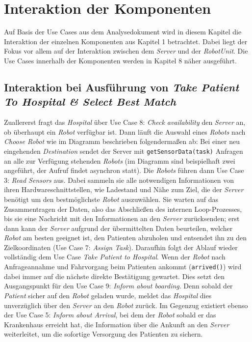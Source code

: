 \section{Interaktion der Komponenten}
Auf Basis der Use Cases aus dem Analysedokument wird in diesem Kapitel die Interaktion der einzelnen Komponenten aus Kapitel 1 betrachtet. Dabei liegt der Fokus vor allem auf der Interaktion zwischen dem \emph{Server} und der \emph{RobotUnit}. Die Use Cases innerhalb der Komponenten werden in Kapitel 8 näher ausgeführt. \\


\subsection*{Interaktion bei Ausführung von \emph{Take Patient To Hospital \& Select Best Match}}

Zuallererst fragt das \emph{Hospital} über Use Case 8: \emph{Check availability} den \emph{Server} an, ob überhaupt ein \emph{Robot} verfügbar ist. Dann läuft die Auswahl eines \emph{Robots} nach \emph{Choose Robot} wie im Diagramm beschrieben folgendermaßen ab: Bei einer neu eingehenden \emph{Destination} sendet der Server mit \texttt{getSensorData(task)} Anfragen an alle zur Verfügung stehenden \emph{Robots} (im Diagramm sind beispielhaft zwei angeführt, der Aufruf findet asynchron statt). Die \emph{Robots} führen dann Use Case 3: \emph{Read Sensors} aus. Dabei sammeln sie alle notwendigen Informationen von ihren Hardwareschnittstellen, wie Ladestand und Nähe zum Ziel, die der \emph{Server} benötigt um den bestmöglichste \emph{Robot} auszuwählen. Sie warten auf das Zusammentragen der Daten, also das Abschließen des internen Loop-Prozesses, bis sie eine Nachricht mit den Informationen an den \emph{Server} zurücksenden; erst dann kann der \emph{Server} aufgrund der übermittelten Daten beurteilen, welcher \emph{Robot} am besten geeignet ist, den Patienten abzuholen und entsendet ihn zu den Zielkoordinaten (Use Case 7: \emph{Assign Task}). Daraufhin folgt der Ablauf wieder vollständig dem Use Case \emph{Take Patient to Hospital}. Wenn der \emph{Robot} nach Anfrageannahme und Fahrvorgang beim Patienten ankommt (\texttt{arrived()}) wird dabei immer auf die nächste direkte Bestätigung gewartet. Dies setzt den Ausgangspunkt für den Use Case 9: \emph{Inform about boarding}. Denn sobald der \emph{Patient} sicher auf den \emph{Robot} geladen wurde, meldet das \emph{Hospital} dies unverzüglich über den \emph{Server} an den \emph{Robot} zurück. Im Gegenzug existiert ebenso der Use Case 5: \emph{Inform about Arrival}, bei dem der \emph{Robot} sobald er das Krankenhaus erreicht hat, die Information über die Ankunft an den \emph{Server} weiterleitet, um die sofortige Versorgung des Patienten zu sichern.

